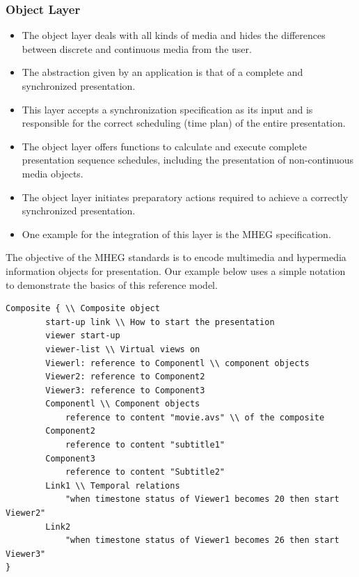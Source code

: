 \subsubsection{Object Layer}
\begin{multicols}{2}
\begin{itemize}
	\item The object layer deals with all kinds of media and hides the differences between discrete and continuous media from the user.
	\item The abstraction given by an application is that of a complete and synchronized presentation. 
	\item This layer accepts a synchronization specification as its input and is responsible for the correct scheduling (time plan) of the entire presentation.
	\item The object layer offers functions to calculate and execute complete presentation sequence schedules, including the presentation of non-continuous media objects.
	\item The object layer initiates preparatory actions required to achieve a correctly synchronized presentation.
	\item One example for the integration of this layer is the MHEG specification.
\end{itemize}
\end{multicols}

The objective of the MHEG standards is to encode multimedia and hypermedia information objects for presentation. Our example below uses a simple notation to
demonstrate the basics of this reference model.

\begin{lstlisting}[frame=single]
Composite { \\ Composite object
		start-up link \\ How to start the presentation
		viewer start-up 
		viewer-list \\ Virtual views on
		Viewerl: reference to Componentl \\ component objects
		Viewer2: reference to Component2
		Viewer3: reference to Component3
		Componentl \\ Component objects
			reference to content "movie.avs" \\ of the composite
		Component2
			reference to content "subtitle1"
		Component3
			reference to content "Subtitle2"
		Link1 \\ Temporal relations
			"when timestone status of Viewer1 becomes 20 then start Viewer2"
		Link2 
			"when timestone status of Viewer1 becomes 26 then start Viewer3"		
}
\end{lstlisting}


